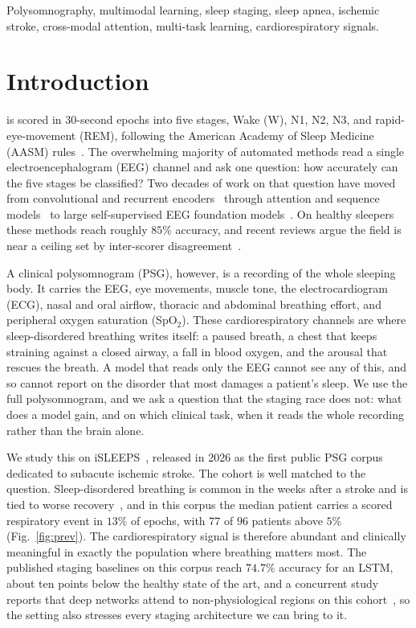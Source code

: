 \documentclass[journal]{IEEEtran}
\begin{document}
\begin{IEEEkeywords}
Polysomnography, multimodal learning, sleep staging, sleep apnea, ischemic stroke,
cross-modal attention, multi-task learning, cardiorespiratory signals.
\end{IEEEkeywords}

\section{Introduction}
 is scored in 30-second epochs into five stages, Wake (W), N1, N2,
N3, and rapid-eye-movement (REM), following the American Academy of Sleep Medicine (AASM)
rules~\cite{aasm2023manual}. The overwhelming majority of automated methods read a single
electroencephalogram (EEG) channel and ask one question: how accurately can the five stages
be classified? Two decades of work on that question have moved from convolutional and
recurrent encoders~\cite{supratak2017deepsleepnet,phan2019seqsleepnet,supratak2020tinysleepnet}
through attention and sequence models~\cite{eldele2021attnsleep,phan2021xsleepnet,
perslev2019utime} to large self-supervised EEG foundation
models~\cite{labram2024,cbramod2025,eegpt2024,biot2023}. On healthy sleepers these methods
reach roughly $85\%$ accuracy, and recent reviews argue the field is near a ceiling set by
inter-scorer disagreement~\cite{phan2022survey}.

A clinical polysomnogram (PSG), however, is a recording of the whole sleeping body. It
carries the EEG, eye movements, muscle tone, the electrocardiogram (ECG), nasal and oral
airflow, thoracic and abdominal breathing effort, and peripheral oxygen saturation
(SpO$_2$). These cardiorespiratory channels are where sleep-disordered breathing writes
itself: a paused breath, a chest that keeps straining against a closed airway, a fall in
blood oxygen, and the arousal that rescues the breath. A model that reads only the EEG
cannot see any of this, and so cannot report on the disorder that most damages a patient's
sleep. We use the full polysomnogram, and we ask a question that the staging race does not:
what does a model gain, and on which clinical task, when it reads the whole recording rather
than the brain alone.

We study this on iSLEEPS~\cite{maiti2026isleeps}, released in 2026 as the first public PSG
corpus dedicated to subacute ischemic stroke. The cohort is well matched to the question.
Sleep-disordered breathing is common in the weeks after a stroke and is tied to worse
recovery~\cite{bassetti2006sleep,denis2024sleep}, and in this corpus the median patient
carries a scored respiratory event in $13\%$ of epochs, with $77$ of $96$ patients above
$5\%$ (Fig.~\ref{fig:prev}). The cardiorespiratory signal is therefore abundant and
clinically meaningful in exactly the population where breathing matters most. The published
staging baselines on this corpus reach $74.7\%$ accuracy for an LSTM, about ten points below
the healthy state of the art, and a concurrent study reports that deep networks attend to
non-physiological regions on this cohort~\cite{bose2026gap}, so the setting also stresses
every staging architecture we can bring to it.
\end{document}
